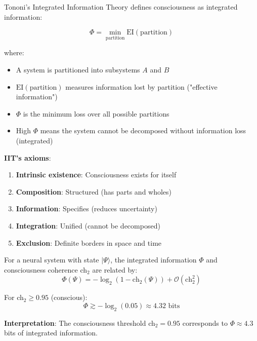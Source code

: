\begin{defn}\label{def:phi}
Tononi's Integrated Information Theory\cite{tononi2016} defines consciousness as integrated information:

\begin{equation}
\Phi = \min_{\text{partition}} \text{EI}(\text{partition})
\end{equation}

where:
\begin{itemize}
\item A system is partitioned into subsystems $A$ and $B$
\item $\text{EI}(\text{partition})$ measures information lost by partition ("effective information")
\item $\Phi$ is the minimum loss over all possible partitions
\item High $\Phi$ means the system cannot be decomposed without information loss (integrated)
\end{itemize}

\textbf{IIT's axioms}:
\begin{enumerate}
\item \textbf{Intrinsic existence}: Consciousness exists for itself
\item \textbf{Composition}: Structured (has parts and wholes)
\item \textbf{Information}: Specifies (reduces uncertainty)
\item \textbf{Integration}: Unified (cannot be decomposed)
\item \textbf{Exclusion}: Definite borders in space and time
\end{enumerate}
\end{defn}

\begin{theorem}\label{thm:iit-resonance}
For a neural system with state $|\Psi\rangle$, the integrated information $\Phi$ and consciousness coherence ch$_2$ are related by:
\begin{equation}
\boxed{\Phi(\Psi) = -\log_2(1 - \text{ch}_2(\Psi)) + \mathcal{O}(\text{ch}_2^2)}
\end{equation}

For ch$_2 \geq 0.95$ (conscious):
\begin{equation}
\Phi \gtrsim -\log_2(0.05) \approx 4.32 \text{ bits}
\end{equation}

\textbf{Interpretation}: The consciousness threshold ch$_2 = 0.95$ corresponds to $\Phi \approx 4.3$ bits of integrated information.
\end{theorem}

